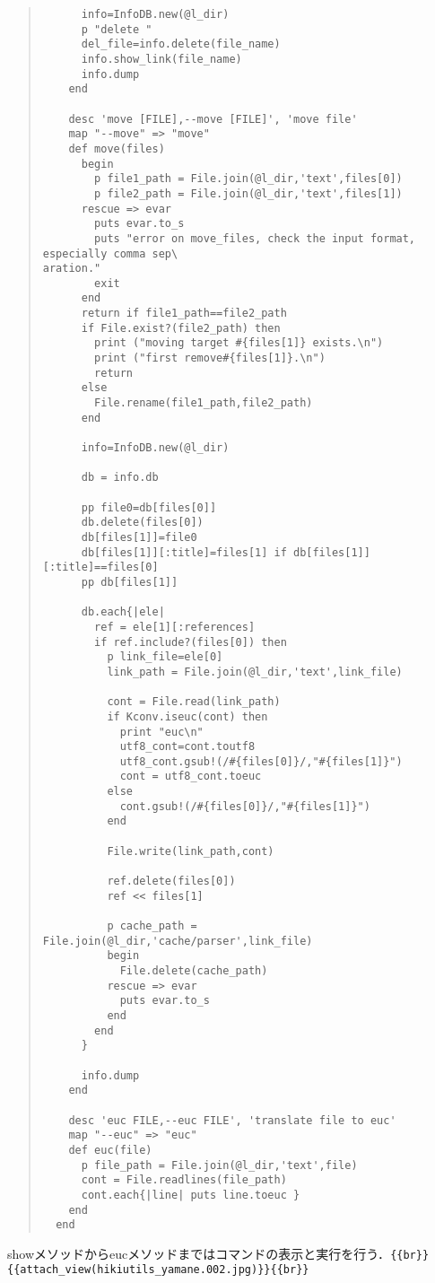\documentclass[10pt,a4j]{article}
\begin{document}
\begin{quote}
\begin{verbatim}
      info=InfoDB.new(@l_dir)
      p "delete "
      del_file=info.delete(file_name)
      info.show_link(file_name)
      info.dump
    end

    desc 'move [FILE],--move [FILE]', 'move file'
    map "--move" => "move"
    def move(files)
      begin
        p file1_path = File.join(@l_dir,'text',files[0])
        p file2_path = File.join(@l_dir,'text',files[1])
      rescue => evar
        puts evar.to_s
        puts "error on move_files, check the input format, especially comma sep\
aration."
        exit
      end
      return if file1_path==file2_path
      if File.exist?(file2_path) then
        print ("moving target #{files[1]} exists.\n")
        print ("first remove#{files[1]}.\n")
        return
      else
        File.rename(file1_path,file2_path)
      end

      info=InfoDB.new(@l_dir)

      db = info.db

      pp file0=db[files[0]]
      db.delete(files[0])
      db[files[1]]=file0
      db[files[1]][:title]=files[1] if db[files[1]][:title]==files[0]
      pp db[files[1]]

      db.each{|ele|
        ref = ele[1][:references]
        if ref.include?(files[0]) then
          p link_file=ele[0]
          link_path = File.join(@l_dir,'text',link_file)

          cont = File.read(link_path)
          if Kconv.iseuc(cont) then
            print "euc\n"
            utf8_cont=cont.toutf8
            utf8_cont.gsub!(/#{files[0]}/,"#{files[1]}")
            cont = utf8_cont.toeuc
          else
            cont.gsub!(/#{files[0]}/,"#{files[1]}")
          end

          File.write(link_path,cont)

          ref.delete(files[0])
          ref << files[1]

          p cache_path = File.join(@l_dir,'cache/parser',link_file)
          begin
            File.delete(cache_path)
          rescue => evar
            puts evar.to_s
          end
        end
      }

      info.dump
    end

    desc 'euc FILE,--euc FILE', 'translate file to euc'
    map "--euc" => "euc"
    def euc(file)
      p file_path = File.join(@l_dir,'text',file)
      cont = File.readlines(file_path)
      cont.each{|line| puts line.toeuc }
    end
  end
\end{verbatim}\end{quote}
showメソッドからeucメソッドまではコマンドの表示と実行を行う．\verb|{{br}}|
\verb|{{attach_view(hikiutils_yamane.002.jpg)}}|\verb|{{br}}|
\end{document}
